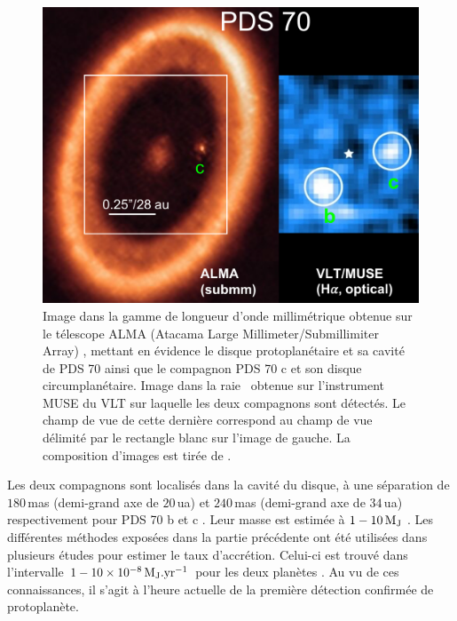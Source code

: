 \begin{figure}[ht!]
    \centering
    \includegraphics[width=\figwidth]{Figure_Chap1/Currie2022_Figure7a.png}
    \caption[Images du système PDS 70.]{Image dans la gamme de longueur d'onde millimétrique obtenue sur le télescope ALMA (Atacama Large Millimeter/Submillimiter Array) \citep{benisty2021}, mettant en évidence le disque protoplanétaire et sa cavité de PDS 70 ainsi que le compagnon PDS 70 c et son disque circumplanétaire. Image dans la raie \ha~obtenue sur l'instrument MUSE du VLT \citep{haffert2019} sur laquelle les deux compagnons sont détectés. Le champ de vue de cette dernière correspond au champ de vue délimité par le rectangle blanc sur l'image de gauche. La composition d'images est tirée de \cite{currie2022a}.}
    \label{fig:PDS70Image}
\end{figure}

Les deux compagnons sont localisés dans la cavité du disque, à une séparation de $180 \,$mas (demi-grand axe de $20 \,$ua) et $240 \,$mas (demi-grand axe de $34 \,$ua) respectivement pour PDS 70 b et c \citep{wang2021}. Leur masse est estimée à $1 - 10 \, \text{$\text{M}_\text{J}$}$ \citep{wang2021, haffert2019}. Les différentes méthodes exposées dans la partie précédente ont été utilisées dans plusieurs études pour estimer le taux d'accrétion. Celui-ci est trouvé dans l'intervalle $1-10 \times 10^{-8} \, \text{$\text{M}_\text{J}$}.\text{yr}^{-1}$ pour les deux planètes \citep{wagner2018, haffert2019, aoyama2019, thanathibodee2019, hashimoto2020}. Au vu de ces connaissances, il s'agit à l'heure actuelle de la première détection confirmée de protoplanète.

